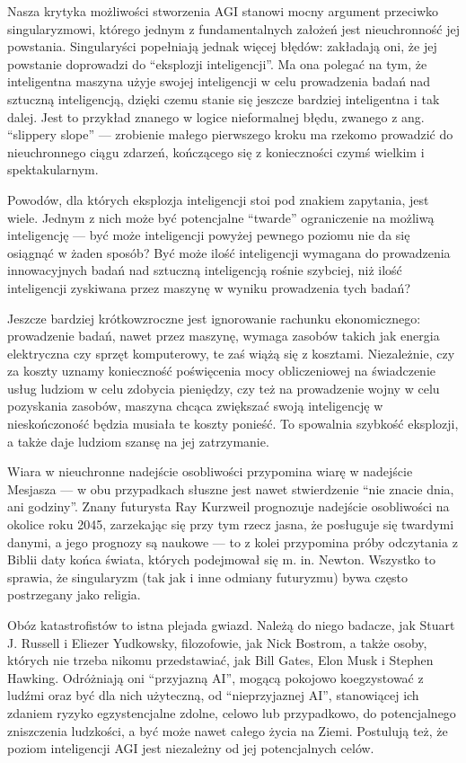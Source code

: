 \documentclass[10pt,a4paper]{article}
\begin{document}
	\par Nasza krytyka możliwości stworzenia AGI stanowi mocny argument przeciwko singularyzmowi, którego jednym z fundamentalnych założeń jest nieuchronność jej powstania. Singularyści popełniają jednak więcej błędów: zakładają oni, że jej powstanie doprowadzi do ``eksplozji inteligencji''. Ma ona polegać na tym, że inteligentna maszyna użyje swojej inteligencji w celu prowadzenia badań nad sztuczną inteligencją, dzięki czemu stanie się jeszcze bardziej inteligentna i tak dalej. Jest to przykład znanego w logice nieformalnej błędu, zwanego z ang. ``slippery slope'' — zrobienie małego pierwszego kroku ma rzekomo prowadzić do nieuchronnego ciągu zdarzeń, kończącego się z konieczności czymś wielkim i spektakularnym.
	\par Powodów, dla których eksplozja inteligencji stoi pod znakiem zapytania, jest wiele. Jednym z nich może być potencjalne ``twarde'' ograniczenie na możliwą inteligencję — być może inteligencji powyżej pewnego poziomu nie da się osiągnąć w żaden sposób? Być może ilość inteligencji wymagana do prowadzenia innowacyjnych badań nad sztuczną inteligencją rośnie szybciej, niż ilość inteligencji zyskiwana przez maszynę w wyniku prowadzenia tych badań?
	\par Jeszcze bardziej krótkowzroczne jest ignorowanie rachunku ekonomicznego: prowadzenie badań, nawet przez maszynę, wymaga zasobów takich jak energia elektryczna czy sprzęt komputerowy, te zaś wiążą się z kosztami. Niezależnie, czy za koszty uznamy konieczność poświęcenia mocy obliczeniowej na świadczenie usług ludziom w celu zdobycia pieniędzy, czy też na prowadzenie wojny w celu pozyskania zasobów, maszyna chcąca zwiększać swoją inteligencję w nieskończoność będzia musiała te koszty ponieść. To spowalnia szybkość eksplozji, a także daje ludziom szansę na jej zatrzymanie.
	\par Wiara w nieuchronne nadejście osobliwości przypomina wiarę w nadejście Mesjasza — w obu przypadkach słuszne jest nawet stwierdzenie ``nie znacie dnia, ani godziny''. Znany futurysta Ray Kurzweil prognozuje nadejście osobliwości na okolice roku 2045, zarzekając się przy tym rzecz jasna, że posługuje się twardymi danymi, a jego prognozy są naukowe — to z kolei przypomina próby odczytania z Biblii daty końca świata, których podejmował się m. in. Newton. Wszystko to sprawia, że singularyzm (tak jak i inne odmiany futuryzmu) bywa często postrzegany jako religia.
	\par Obóz katastrofistów to istna plejada gwiazd. Należą do niego badacze, jak Stuart J. Russell i Eliezer Yudkowsky, filozofowie, jak Nick Bostrom, a także osoby, których nie trzeba nikomu przedstawiać, jak Bill Gates, Elon Musk i Stephen Hawking. Odróżniają oni ``przyjazną AI'', mogącą pokojowo koegzystować z ludźmi oraz być dla nich użyteczną, od ``nieprzyjaznej AI'', stanowiącej ich zdaniem ryzyko egzystencjalne zdolne, celowo lub przypadkowo, do potencjalnego zniszczenia ludzkości, a być może nawet całego życia na Ziemi. Postulują też, że poziom inteligencji AGI jest niezależny od jej potencjalnych celów.
\end{document}
